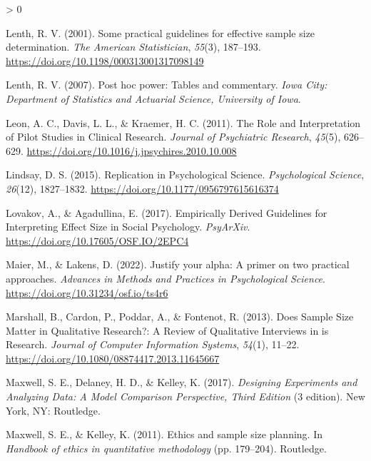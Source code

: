 \documentclass[
  english,
  ,jou,floatsintext]{apa6}
\newlength{\cslhangindent}
\newenvironment{CSLReferences}[2] %
 {%
  \setlength{\parindent}{0pt}
  \ifodd #1 \everypar{\setlength{\hangindent}{\cslhangindent}}\ignorespaces\fi
  \ifnum #2 > 0
  \setlength{\parskip}{#2\baselineskip}
  \fi
 }%
 {}
\begin{document}
\begin{CSLReferences}{1}{0}
\leavevmode\hypertarget{ref-lenth_practical_2001}{}%
Lenth, R. V. (2001). Some practical guidelines for effective sample size determination. \emph{The American Statistician}, \emph{55}(3), 187--193. \url{https://doi.org/10.1198/000313001317098149}

\leavevmode\hypertarget{ref-lenth_post_2007}{}%
Lenth, R. V. (2007). Post hoc power: Tables and commentary. \emph{Iowa City: Department of Statistics and Actuarial Science, University of Iowa}.

\leavevmode\hypertarget{ref-leon_role_2011}{}%
Leon, A. C., Davis, L. L., \& Kraemer, H. C. (2011). The {Role} and {Interpretation} of {Pilot Studies} in {Clinical Research}. \emph{Journal of Psychiatric Research}, \emph{45}(5), 626--629. \url{https://doi.org/10.1016/j.jpsychires.2010.10.008}

\leavevmode\hypertarget{ref-lindsay_replication_2015}{}%
Lindsay, D. S. (2015). Replication in {Psychological Science}. \emph{Psychological Science}, \emph{26}(12), 1827--1832. \url{https://doi.org/10.1177/0956797615616374}

\leavevmode\hypertarget{ref-lovakov_empirically_2017}{}%
Lovakov, A., \& Agadullina, E. (2017). Empirically {Derived Guidelines} for {Interpreting Effect Size} in {Social Psychology}. \emph{PsyArXiv}. \url{https://doi.org/10.17605/OSF.IO/2EPC4}

\leavevmode\hypertarget{ref-maier_justify_2022}{}%
Maier, M., \& Lakens, D. (2022). Justify your alpha: {A} primer on two practical approaches. \emph{Advances in Methods and Practices in Psychological Science}. \url{https://doi.org/10.31234/osf.io/ts4r6}

\leavevmode\hypertarget{ref-marshall_does_2013}{}%
Marshall, B., Cardon, P., Poddar, A., \& Fontenot, R. (2013). Does {Sample Size Matter} in {Qualitative Research}?: {A Review} of {Qualitative Interviews} in is {Research}. \emph{Journal of Computer Information Systems}, \emph{54}(1), 11--22. \url{https://doi.org/10.1080/08874417.2013.11645667}

\leavevmode\hypertarget{ref-maxwell_designing_2017}{}%
Maxwell, S. E., Delaney, H. D., \& Kelley, K. (2017). \emph{Designing {Experiments} and {Analyzing Data}: {A Model Comparison Perspective}, {Third Edition}} (3 edition). {New York, NY}: {Routledge}.

\leavevmode\hypertarget{ref-maxwell_ethics_2011}{}%
Maxwell, S. E., \& Kelley, K. (2011). Ethics and sample size planning. In \emph{Handbook of ethics in quantitative methodology} (pp. 179--204). {Routledge}.


\end{CSLReferences}
\end{document}
